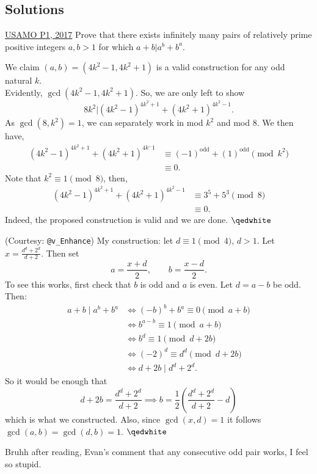 \subsection{Solutions}
\begin{problem}{1}{\href{https://artofproblemsolving.com/community/c5h1433969p8108366}{USAMO P1, 2017}} 
	Prove that there exists infinitely many pairs of relatively prime positive integers $a,b>1$ for which $a+b\lvert a^b+b^a$.
	\begin{numsolution}{1} We claim $(a,b)=(4k^2-1, 4k^2+1)$ is a valid construction for any odd natural $k$.\\
	Evidently, $\gcd(4k^2-1, 4k^2+1)$. So, we are only left to show
	$$8k^2\lvert (4k^2-1)^{4k^2+1}+(4k^2+1)^{4k^2-1}.$$
	As $\gcd(8, k^2)=1$, we can separately work in mod $k^2$ and mod $8$. We then have,
	\begin{align*}
		(4k^2-1)^{4k^2+1}+(4k^2+1)^{4k^-1} &\equiv (-1)^{\text{odd}}+(1)^{\text{odd}}\pmod {k^2}\\
		&\equiv 0.
	\end{align*}
	Note that $k^2\equiv 1\pmod 8$, then,
	\begin{align*}
		(4k^2-1)^{4k^2+1}+(4k^2+1)^{4k^2-1} &\equiv 3^5+5^3\pmod 8\\
		&\equiv 0.	
	\end{align*}
	Indeed, the proposed construction is valid and we are done. $\qedwhite$
	\end{numsolution}
	\begin{numsolution}{2}(Courtesy: \texttt{@v\_Enhance}) My construction: let $d \equiv 1 \pmod 4$, $d > 1$. Let $x = \frac{d^d+2^d}{d+2}$. Then set\[ a = \frac{x+d}{2}, \qquad 	b = \frac{x-d}{2}. \]To see this works, first check that $b$ is odd and $a$ is even. Let $d = a-b$ be odd. Then:\begin{align*} 	a+b \mid a^b+b^a &\iff 	(-b)^b + b^a \equiv 0 \pmod{a+b} \\ 	&\iff b^{a-b} \equiv 1 \pmod{a+b} \\ 	&\iff b^d \equiv 1 \pmod{d+2b} \\ 	&\iff (-2)^d \equiv d^d \pmod{d+2b} \\ 	&\iff d+2b \mid d^d + 2^d. \end{align*}So it would be enough that\[ d+2b = \frac{d^d+2^d}{d+2}  \implies b = \frac{1}{2} \left( \frac{d^d+2^d}{d+2} - d \right) \]which is what we constructed. Also, since $\gcd(x,d) = 1$ it follows $\gcd(a,b) = \gcd(d,b) = 1$. $\qedwhite$
	
	\begin{remark}
		Bruhh after reading, Evan's comment that any consecutive odd pair works, I feel so stupid.
	\end{remark}
	\end{numsolution}
\end{problem}
	
